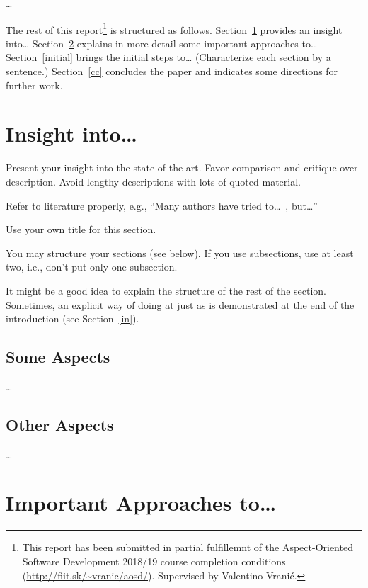 \documentclass[11pt,english,a4paper,twoside]{article}
\begin{document}
\ldots

The rest of this report\footnote{This report has been submitted in partial fulfillemnt of the Aspect-Oriented Software Development 2018/19 course completion conditions (\url{http://fiit.sk/~vranic/aosd/}). Supervised by Valentino Vranić.}
is structured as follows.
Section~\ref{insight} provides an insight into\ldots{}
Section~\ref{approaches} explains in more detail some important approaches to\ldots{}
Section~\ref{initial} brings the initial steps to\ldots{}
(Characterize each section by a sentence.)
Section~\ref{cc} concludes the paper and indicates some directions for further work.




\section{Insight into\ldots} \label{insight}

Present your insight into the state of the art.
Favor comparison and critique over description.
Avoid lengthy descriptions with lots of quoted material.

Refer to literature properly, e.g.,
``Many authors have tried to\ldots~\cite{Vranic:AJParadigms,Alexander:Timeless}, but\ldots'' 

Use your own title for this section.

You may structure your sections (see below).
If you use subsections, use at least two, i.e., don't put only one subsection.

It might be a good idea to explain the structure of the rest of the section. Sometimes, an explicit way of doing at just as is demonstrated at the end of the introduction (see Section~\ref{in}).


\subsection{Some Aspects} \label{insight-some}

\ldots

\subsection{Other Aspects} \label{insight-other}

\ldots



\section{Important Approaches to\ldots} \label{approaches}
\end{document}

